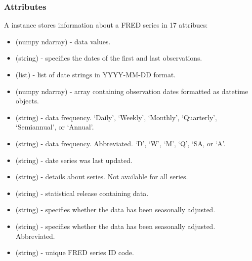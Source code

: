 \documentclass[letterpaper,10pt,openany,oneside,english]{sphinxmanual}
\begin{document}
\subsubsection{Attributes}
\label{\detokenize{fredpy_examples:Attributes}}
A {\hyperref[\detokenize{series_class:fredpy.series}]{}} instance stores information about a FRED series in 17 attribues:
\begin{itemize}
\item {} 
 (numpy ndarray) - data values.

\item {} 
 (string) - specifies the dates of the first and last observations.

\item {} 
 (list) - list of date strings in YYYY-MM-DD format.

\item {} 
 (numpy ndarray) - array containing observation dates formatted as datetime objects.

\item {} 
 (string) - data frequency. ‘Daily’, ‘Weekly’, ‘Monthly’, ‘Quarterly’, ‘Semiannual’, or ‘Annual’.

\item {} 
 (string) - data frequency. Abbreviated. ‘D’, ‘W’, ‘M’, ‘Q’, ‘SA, or ‘A’.

\item {} 
 (string) - date series was last updated.

\item {} 
 (string) - details about series. Not available for all series.

\item {} 
 (string) - statistical release containing data.

\item {} 
 (string) - specifies whether the data has been seasonally adjusted.

\item {} 
 (string) - specifies whether the data has been seasonally adjusted. Abbreviated.

\item {} 
 (string) - unique FRED series ID code.


\end{itemize}
\end{document}
